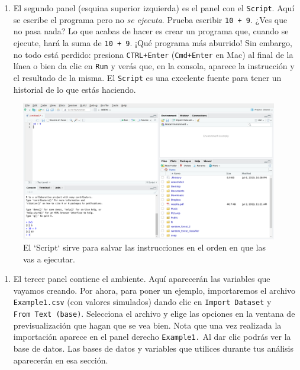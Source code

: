 \documentclass[
]{book}
\providecommand{\tightlist}{%
  \setlength{\itemsep}{0pt}\setlength{\parskip}{0pt}}
\begin{document}
\begin{enumerate}
\def\labelenumi{\arabic{enumi}.}
\setcounter{enumi}{1}
\tightlist
\item
  El segundo panel (esquina superior izquierda) es el panel con el \texttt{Script}. Aquí se escribe el programa pero no \emph{se ejecuta}. Prueba escribir \texttt{10\ +\ 9}. ¿Ves que no pasa nada? Lo que acabas de hacer es crear un programa que, cuando se ejecute, hará la suma de \texttt{10\ +\ 9}. ¡Qué programa más aburrido! Sin embargo, no todo está perdido: presiona \texttt{CTRL+Enter} (\texttt{Cmd+Enter} en Mac) al final de la línea o bien da clic en \texttt{Run} y verás que, en la consola, aparece la instrucción y el resultado de la misma. El \texttt{Script} es una excelente fuente para tener un historial de lo que estás haciendo.
\end{enumerate}

\begin{figure}

{\centering \includegraphics[width=40in]{images/RStudio5} 

}

\caption{El `Script` sirve para salvar las instrucciones en el orden en que las vas a ejecutar.}\label{fig:unnamed-chunk-12}
\end{figure}

\begin{enumerate}
\def\labelenumi{\arabic{enumi}.}
\setcounter{enumi}{2}
\tightlist
\item
  El tercer panel contiene el ambiente. Aquí aparecerán las variables que vayamos creando. Por ahora, para poner un ejemplo, importaremos el archivo \texttt{Example1.csv} (con valores simulados) dando clic en \texttt{Import\ Dataset} y \texttt{From\ Text\ (base)}. Selecciona el archivo y elige las opciones en la ventana de previsualización que hagan que se vea bien. Nota que una vez realizada la importación aparece en el panel derecho \texttt{Example1.} Al dar clic podrás ver la base de datos. Las bases de datos y variables que utilices durante tus análisis aparecerán en esa sección.
\end{enumerate}
\end{document}
